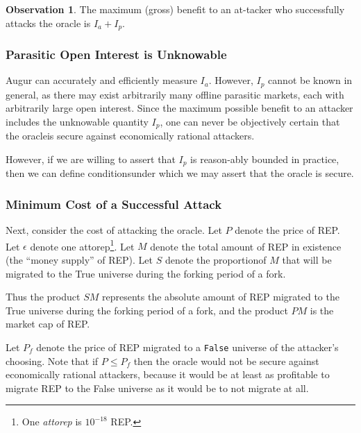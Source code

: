 \documentclass[12pt,floatfix,reprint,nofootinbib,amsmath,amssymb,epsfig,pre,floats,letterpaper,groupedaffiliation]{revtex4-1}
\theoremstyle{definition}
\newtheorem{observation}{Observation}
\theoremstyle{definition}
\begin{document}
\begin{observation}
The maximum (gross) benefit to an at-\linebreak tacker who successfully attacks the oracle is $I_a + I_p$.
\end{observation}

\subsubsection{Parasitic Open Interest is Unknowable}

Augur can accurately and efficiently measure $I_a$. However, $I_p$ cannot be known in general, as there may exist arbitrarily many offline parasitic markets, each with arbitrarily large open interest. Since the maximum possible benefit to an attacker includes the unknowable quantity $I_p$, one can never be objectively certain that the oracle\linebreak is secure against economically rational attackers.

However, if we are willing to assert that $I_p$ is reason-\linebreak ably bounded in practice, then we can define conditions\linebreak under which we may assert that the oracle is secure.

\subsubsection{Minimum Cost of a Successful Attack}

Next, consider the cost of attacking the oracle. Let $P$ denote the price of REP. Let $\epsilon$ denote one attorep\footnote{One \textit{attorep} is $10^{-18}$ REP.}. Let $M$ denote the total amount of REP in existence (the ``money supply'' of REP). Let $S$ denote the proportion\linebreak of $M$ that will be migrated to the True universe during the forking period of a fork.

Thus the product $SM$ represents the absolute amount of REP migrated to the True universe during the forking period of a fork, and the product $PM$ is the market cap of REP.

Let $P_f$ denote the price of REP migrated to a \texttt{False} universe of the attacker's choosing. Note that if $P \leq P_f$ then the oracle would not be secure against economically rational attackers, because it would be at least as prof\-itable to migrate REP to the False universe as it would be to not migrate at all.
\end{document}
